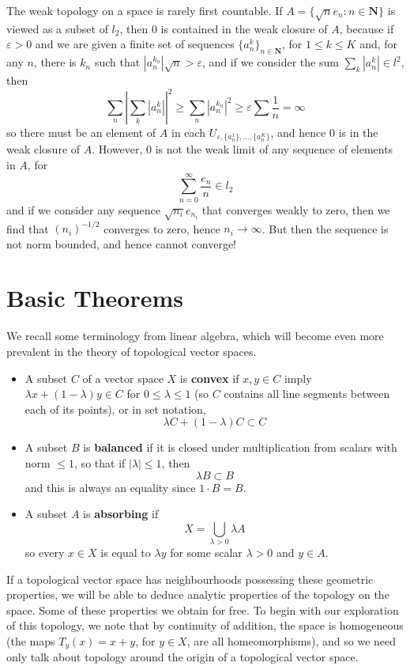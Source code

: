 \begin{example}
    The weak topology on a space is rarely first countable. If $A = \{ \sqrt{n} e_n : n \in \mathbf{N} \}$ is viewed as a subset of $l_2$, then 0 is contained in the weak closure of $A$, because if $\varepsilon > 0$ and we are given a finite set of sequences $\{ a_n^k \}_{n \in \mathbf{N}}$, for $1 \leq k \leq K$ and, for any $n$, there is $k_n$ such that $|a_n^{k_n}| \sqrt{n} > \varepsilon$, and if we consider the sum $\sum_k |a_n^k| \in l^2$, then
    \[ \sum_n \left|\sum_k |a_n^k| \right|^2 \geq \sum_n |a_n^{k_n}|^2 \geq \varepsilon \sum \frac{1}{n} = \infty \]
    so there must be an element of $A$ in each $U_{\varepsilon, \{ a_n^1 \}, \dots, \{ a_n^K \}}$, and hence $0$ is in the weak closure of $A$. However, 0 is not the weak limit of any sequence of elements in $A$, for
    \[ \sum_{n = 0}^\infty \frac{e_n}{n} \in l_2 \]
    and if we consider any sequence $\sqrt{n_i} e_{n_i}$ that converges weakly to zero, then we find that $(n_i)^{-1/2}$ converges to zero, hence $n_i \to \infty$. But then the sequence is not norm bounded, and hence cannot converge!
\end{example}

\section{Basic Theorems}

We recall some terminology from linear algebra, which will become even more prevalent in the theory of topological vector spaces.
%
\begin{itemize}
    \item A subset $C$ of a vector space $X$ is {\bf convex} if $x, y \in C$ imply $\lambda x + (1 - \lambda) y \in C$ for $0 \leq \lambda \leq 1$ (so $C$ contains all line segments between each of its points), or in set notation,
    \[ \lambda C + (1 - \lambda) C \subset C \]

    \item A subset $B$ is {\bf balanced} if it is closed under multiplication from scalars with norm $\leq 1$, so that if $|\lambda| \leq 1$, then
    \[ \lambda B \subset B \]
    and this is always an equality since $1 \cdot B = B$.

    \item A subset $A$ is {\bf absorbing} if
    \[ X = \bigcup_{\lambda > 0} \lambda A \]
    so every $x \in X$ is equal to $\lambda y$ for some scalar $\lambda > 0$ and $y \in A$.
\end{itemize}
%
If a topological vector space has neighbourhoods possessing these geometric properties, we will be able to deduce analytic properties of the topology on the space. Some of these properties we obtain for free. To begin with our exploration of this topology, we note that by continuity of addition, the space is homogeneous (the maps $T_y(x) = x + y$, for $y \in X$, are all homeomorphisms), and so we need only talk about topology around the origin of a topological vector space.

